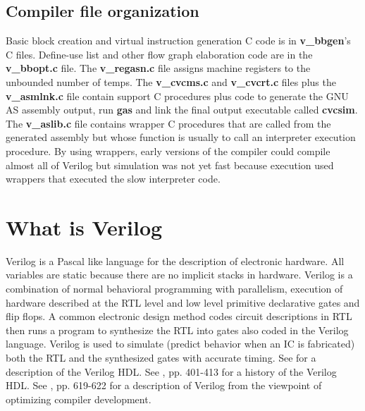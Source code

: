 \documentclass[preprint, authoryear]{sigplanconf}
\begin{document}
\subsection{Compiler file organization}
\par
Basic block creation and virtual instruction generation C code is
in \textbf{v_bbgen}'s C files.  Define-use list and
other flow graph elaboration code are in the
\textbf{v_bbopt.c} file. 
The \textbf{v_regasn.c} file assigns machine registers to the unbounded number
of temps.  The \textbf{v_cvcms.c} and \textbf{v_cvcrt.c} files
plus the \textbf{v_asmlnk.c} file contain support C procedures
plus code to generate
the GNU AS assembly output, run \textbf{gas} and link the final output
executable called \textbf{cvcsim}.
The \textbf{v_aslib.c} file contains wrapper
C procedures that are called from the generated assembly but whose function
is usually to call an interpreter execution procedure.
By using wrappers, early
versions of the compiler could compile almost all of Verilog but simulation
was not yet fast because execution used wrappers that executed the
slow interpreter code.
\section{What is Verilog}
\par
Verilog is a Pascal like language \cite{Wirth1971} for the description
of electronic hardware.  All variables are static because there are
no implicit stacks in hardware.  Verilog is a combination of normal behavioral
programming with parallelism, execution of hardware described at the
RTL level and low level primitive declarative
gates and flip flops.  A common electronic design method codes circuit
descriptions in RTL then runs a program to synthesize the RTL into
gates also coded in the Verilog language.  Verilog is used to simulate
(predict behavior when an IC is fabricated) both the RTL and the synthesized
gates with accurate timing.  See \cite{Thomas2002} for a description of
the Verilog HDL.  See \cite{Sutherland2006}, pp. 401-413 for a history 
of the Verilog HDL.  See \cite{Allen2002}, pp. 619-622 for a description
of Verilog from the viewpoint of optimizing compiler development.
\end{document}
